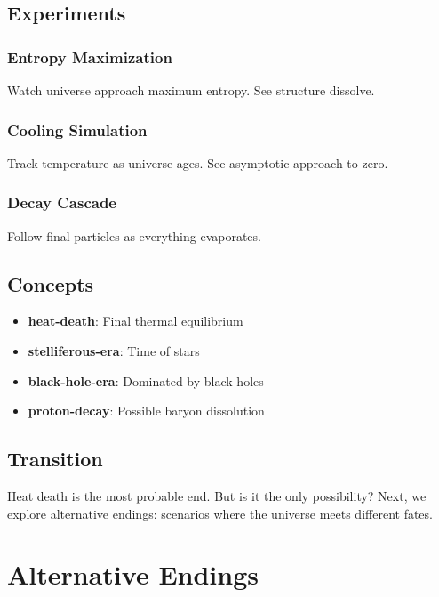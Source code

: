 \documentclass[
  11pt,
  letterpaper,
  twoside,
  openright]{book}
\providecommand{\tightlist}{%
  \setlength{\itemsep}{0pt}\setlength{\parskip}{0pt}}
\begin{document}
\section{Experiments}\label{experiments-41}

\subsection{Entropy Maximization}\label{entropy-maximization}

Watch universe approach maximum entropy. See structure dissolve.

\subsection{Cooling Simulation}\label{cooling-simulation}

Track temperature as universe ages. See asymptotic approach to zero.

\subsection{Decay Cascade}\label{decay-cascade}

Follow final particles as everything evaporates.

\section{Concepts}\label{concepts-42}

\begin{itemize}
\tightlist
\item
  \textbf{heat-death}: Final thermal equilibrium
\item
  \textbf{stelliferous-era}: Time of stars
\item
  \textbf{black-hole-era}: Dominated by black holes
\item
  \textbf{proton-decay}: Possible baryon dissolution
\end{itemize}

\section{Transition}\label{transition-43}

Heat death is the most probable end. But is it the only possibility?
Next, we explore alternative endings: scenarios where the universe meets
different fates.

\chapter{Alternative Endings}\label{sec-alternative-endings}
\end{document}
